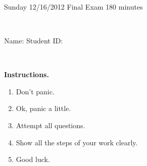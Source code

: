 \documentclass[12pt, oneside]{amsart}
\begin{document}
%
 
\begin{center}
\hrulefill\\
{\bf \textsf{\raisebox{-0.10cm}{Fall 2012: MATH 143} \hspace{\fill} 
\raisebox{-0.10cm}{Calculus III} \hspace{\fill}
\raisebox{-0.10cm}{David Karapetyan}}}\\
\hrulefill\\
{\large \rule{0cm}{1.2cm} \textsf{Sunday 12/16/2012} \hfill
\textsf{Final Exam} \hfill  \textsf{180 minutes}}\\
{\large\rule{0cm}{1.2cm}\textsf{Name: \framebox[2.9in]{\rule{0cm}{0.8cm}} 
\hspace{\fill}
Student ID: \framebox[2.1in]{\rule{0cm}{0.8cm}}}}\\
\end{center}
\vspace{0.8cm}

\noindent
{\bf \textsf{Instructions.}}

\begin{enumerate}
\item Don't panic.
\item Ok, panic a little.
\item Attempt all questions.   
\item Show all the steps of your work clearly.  
\item Good luck. 
\end{enumerate}

\vfill

\end{document}
